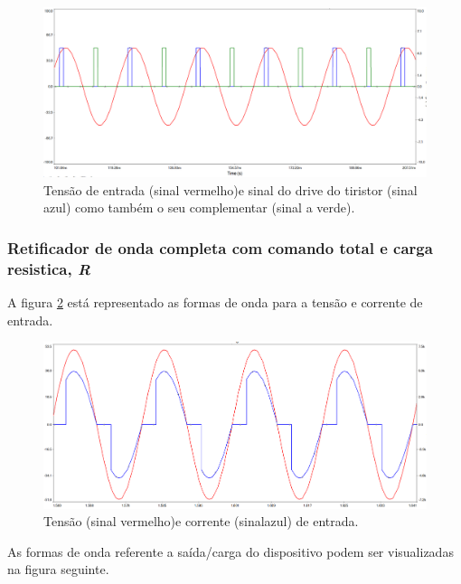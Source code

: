 \documentclass[a4paper,11pt]{article}
\numberwithin{equation}{section}
\begin{document}
\begin{figure}[h]
	\centering
	\includegraphics[keepaspectratio=true, scale=0.4]{img/circuito4}
	\caption{Tensão de entrada (sinal vermelho)e sinal do drive do tiristor (sinal azul) como também o seu complementar (sinal a verde).}
	\label{fig:circuit_6}
	\vspace{-0.8em}
\end{figure}

\subsubsection{Retificador de onda completa com comando total e carga resistica, \textit{R}}

A figura \ref{fig:circuit_7}  está representado as formas de onda para a tensão e corrente de entrada.

\begin{figure}[h]
	\centering
	\includegraphics[keepaspectratio=true, scale=0.4]{img/circuito5}
	\caption{Tensão (sinal vermelho)e corrente (sinalazul) de entrada.}
	\label{fig:circuit_7}
	\vspace{-0.8em}
\end{figure}

\pagebreak
As formas de onda referente a saída/carga do dispositivo podem ser visualizadas na figura seguinte.
\end{document}

